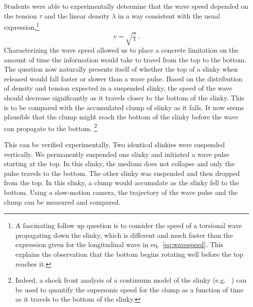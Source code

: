 \documentclass[prb,preprint,superscriptaddress]{revtex4-1}
\newcommand{\eq}[1]{eq.~\eqref{eq:#1}}
\begin{document}
Students were able to experimentally determine that the wave speed depended on the 
tension $\tau$ and the linear density $\lambda$ in a way consistent with the
usual expression,\footnote{A fascinating follow up question is to consider the speed
of a torsional wave propagating down the slinky, which is different and much faster
than the expression given for the longitudinal wave in \eq{wavespeed}.
This explains the observation that the bottom begins
rotating well before the top reaches it.}
\begin{equation}
  \label{eq:wavespeed}
  v=\sqrt{\tfrac{\tau}{\lambda}}\,.
\end{equation}
Characterizing the wave speed allowed us to place a concrete limitation on the amount
of time the information would take to travel from the top to the bottom. The question
now naturally presents itself of whether the top of a slinky when released would fall
faster or slower than a wave pulse. Based on the distribution 
of density and tension expected in a suspended slinky, the speed of the wave should decrease significantly as
it travels closer to the bottom of the slinky. This is to be compared with the
accumulated clump of slinky as it falls. It now seems plausible
that the clump might reach the bottom of the slinky before the wave can propagate to the bottom. \footnote{Indeed, a shock front analysis of a continuum model of the slinky (e.g. ~\cite{Unruh2011}) can be used to quantify the supersonic speed for the clump as a function of time as it travels to the bottom of the slinky.} 

This can be verified experimentally. Two identical slinkies were suspended vertically.
We permanently suspended one slinky and initiated a wave pulse starting at the top.
In this slinky, the medium does not collapse and only the pulse travels to the bottom. The other slinky was suspended and then dropped from the top. In this
slinky, a clump would accumulate as the slinky fell to the bottom. Using a slow-motion camera, the trajectory of the wave pulse
and the clump can be measured and compared.
\end{document}
